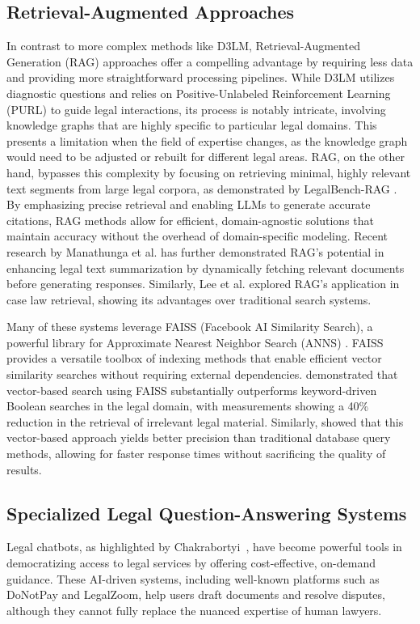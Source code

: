 \subsection{Retrieval-Augmented Approaches}
In contrast to more complex methods like D3LM, Retrieval-Augmented Generation
(RAG) approaches offer a compelling advantage by requiring less data and
providing more straightforward processing pipelines. While D3LM utilizes
diagnostic questions and relies on Positive-Unlabeled Reinforcement Learning
(PURL) to guide legal interactions, its process is notably intricate,
involving knowledge graphs that are highly specific to particular
legal domains. This presents a limitation when the field of expertise changes,
as the knowledge graph would need to be adjusted or rebuilt for different legal
areas.
RAG, on the other hand, bypasses this complexity by focusing on retrieving
minimal, highly relevant text segments from large legal corpora, as
demonstrated by LegalBench-RAG \cite{pipitone2024legalbenchragbenchmarkretrievalaugmentedgeneration}.
By emphasizing precise retrieval and enabling LLMs to generate accurate
citations, RAG methods allow for efficient, domain-agnostic solutions that
maintain accuracy without the overhead of domain-specific modeling. Recent
research by Manathunga et al. \cite{manathunga2023retrievalaugmentedgenerationrepresentative} has
further demonstrated RAG's potential in enhancing legal text summarization by dynamically
fetching relevant documents before generating responses. Similarly,
Lee et al. \cite{ryu-etal-2023-retrieval} explored RAG's application in case
law retrieval, showing its advantages over traditional search systems.

Many of these systems leverage FAISS (Facebook AI Similarity Search), a powerful library for 
Approximate Nearest Neighbor Search (ANNS) \cite{douze2025faisslibrary}. FAISS provides a versatile 
toolbox of indexing methods that enable efficient vector similarity searches without requiring external 
dependencies. \cite{zeng2023scalableeffectivegenerativeinformation} demonstrated that vector-based search using 
FAISS substantially outperforms keyword-driven Boolean searches in the legal domain, with measurements showing a 40\% 
reduction in the retrieval of irrelevant legal material. Similarly, \cite{panchal2025lawpalretrievalaugmented} showed 
that this vector-based approach yields better precision than traditional database query methods, allowing for faster 
response times without sacrificing the quality of results.

\subsection{Specialized Legal Question-Answering Systems}
Legal chatbots, as highlighted by Chakrabortyi~\cite{chakraborty2023revolutionizing}, 
have become powerful tools in democratizing access to legal services by 
offering cost-effective, on-demand guidance. These AI-driven systems, 
including well-known platforms such as DoNotPay and LegalZoom, 
help users draft documents and resolve disputes, although they cannot 
fully replace the nuanced expertise of human lawyers.

